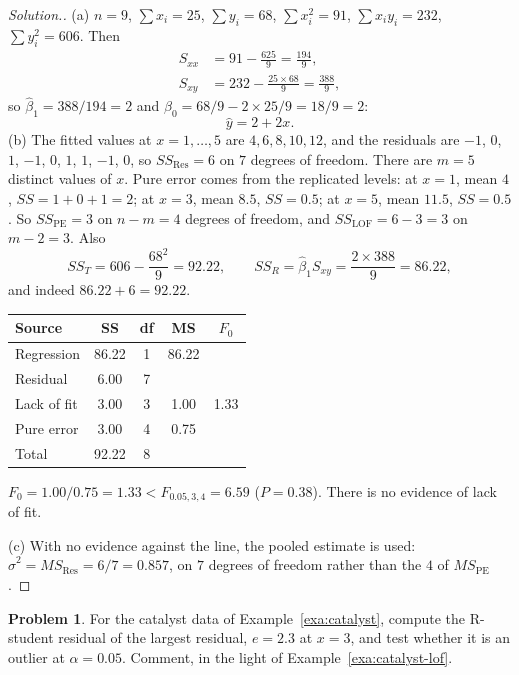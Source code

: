 \documentclass[11pt,a4paper]{article}
\numberwithin{equation}{section}
\theoremstyle{definition}
\newtheorem{problemx}{Problem}[subsection]
\newenvironment{problem}{\begin{problemx}}{\end{problemx}}
\newenvironment{solution}
  {\renewcommand{\qedsymbol}{}\begin{proof}[\textit{Solution}.]}
  {\end{proof}}
\begin{document}
\begin{solution}
(a) $n = 9$, $\sum x_i = 25$, $\sum y_i = 68$, $\sum x_i^2 = 91$, $\sum x_i y_i = 232$,
$\sum y_i^2 = 606$. Then
\begin{align*}
S_{xx} &= 91 - \frac{625}{9} = \frac{194}{9}, \\
S_{xy} &= 232 - \frac{25 \times 68}{9} = \frac{388}{9},
\end{align*}
so $\hat\beta_1 = 388/194 = 2$ and $\hat\beta_0 = 68/9 - 2 \times 25/9 = 18/9 = 2$:
\[
\hat y = 2 + 2x .
\]
(b) The fitted values at $x = 1, \dots, 5$ are $4, 6, 8, 10, 12$, and the residuals are
$-1$, $0$, $1$, $-1$, $0$, $1$, $1$, $-1$, $0$, so $SS_{\mathrm{Res}} = 6$ on $7$ degrees of freedom.
There are $m = 5$ distinct values of $x$. Pure error comes from the replicated levels:
at $x = 1$, mean $4$, $SS = 1 + 0 + 1 = 2$; at $x = 3$, mean $8.5$, $SS = 0.5$; at $x = 5$,
mean $11.5$, $SS = 0.5$. So $SS_{\mathrm{PE}} = 3$ on $n - m = 4$ degrees of freedom, and
$SS_{\mathrm{LOF}} = 6 - 3 = 3$ on $m - 2 = 3$. Also
\[
SS_T = 606 - \frac{68^2}{9} = 92.22, \qquad SS_R = \hat\beta_1 S_{xy} = \frac{2 \times 388}{9} = 86.22 ,
\]
and indeed $86.22 + 6 = 92.22$.
\begin{center}
\begin{tabular}{lcccc}
Source & SS & df & MS & $F_0$ \\
\hline
Regression & 86.22 & 1 & 86.22 & \\
Residual & 6.00 & 7 & & \\
\quad Lack of fit & 3.00 & 3 & 1.00 & 1.33 \\
\quad Pure error & 3.00 & 4 & 0.75 & \\
\hline
Total & 92.22 & 8 & & \\
\end{tabular}
\end{center}
$F_0 = 1.00/0.75 = 1.33 < F_{0.05,3,4} = 6.59$ ($P = 0.38$). There is no evidence of lack of
fit.

(c) With no evidence against the line, the pooled estimate is used:
$\hat\sigma^2 = MS_{\mathrm{Res}} = 6/7 = 0.857$, on $7$ degrees of freedom rather than the $4$ of
$MS_{\mathrm{PE}}$.
\end{solution}

\begin{problem}\label{prob:catalyst-rstudent}
For the catalyst data of Example~\ref{exa:catalyst}, compute the R-student residual of the
largest residual, $e = 2.3$ at $x = 3$, and test whether it is an outlier at $\alpha = 0.05$.
Comment, in the light of Example~\ref{exa:catalyst-lof}.
\end{problem}
\end{document}
